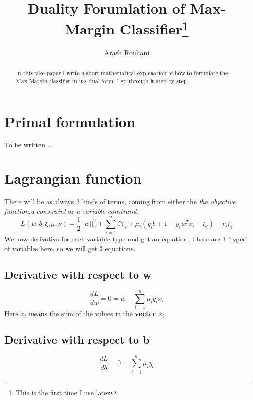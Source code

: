 \documentclass[a4paper,11pt]{article}
\title{Duality Forumlation of Max-Margin Classifier\footnote{This is the first time I use latex}}
\author{Arash Rouhani}
\begin{document}
\maketitle

\begin{abstract}
In this fake-paper I write a short mathematical explenation
of how to formulate the Max-Margin classifier in it's dual form.
I go through it step by step. 

\end{abstract}

\section{Primal formulation}
To be written ...
\section{Lagrangian function}
There will be as always 3 kinds of terms, coming from either the \textit{the objective function},\textit{a constraint} or \textit{a variable constraint}.
\begin{equation}
L(w, b, \xi, \mu, \nu) = \frac{1}{2} ||w||^2_2 + \sum\limits_{i=1}^n {C\xi_i + \mu_i(y_ib + 1 - y_iw^Tx_i - \xi_i) - \nu_i\xi_i}
\end{equation}
We now derivativs for each variable-type and get an equation. There are 3 'types' of variables here, so we will get 3 equations.

\subsection{Derivative with respect to w}
  \begin{equation}
    \frac{dL}{dw} = 0 = w - \sum\limits_{i=1}^n {\mu_i y_i x_i}
  \end{equation}
  Here $x_i$ means the sum of the values in the \textbf{vector} $x_i$.
\subsection{Derivative with respect to b}
  \begin{equation}
    \frac{dL}{db} = 0 = \sum\limits_{i=1}^n {\mu_i y_i}
  \end{equation}
\end{document}
